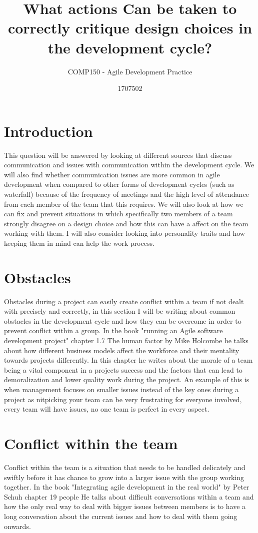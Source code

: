 \documentclass{scrartcl}
\title{What actions Can be taken to correctly critique design choices in the development cycle?}
\subtitle{COMP150 - Agile Development Practice}
\author{1707502}
\begin{document}
\maketitle

\abstract{}

\section{Introduction}

This question will be answered by looking at different sources that discuss communication and issues with communication within the development cycle. We will also find whether communication issues are more common in agile development when compared to other forms of development cycles (such as waterfall) because of the frequency of meetings and the high level of attendance from each member of the team that this requires. We will also look at how we can fix and prevent situations in which specifically two members of a team strongly disagree on a design choice and how this can have a affect on the team working with them. I will also consider looking into personality traits and how keeping them in mind can help the work process.

\section{Obstacles}

Obstacles during a project can easily create conflict within a team if not dealt with precisely and correctly, in this section I will be writing about common obstacles in the development cycle and how they can be overcome in order to prevent conflict within a group. In the book "running an Agile software development project" chapter 1.7 The human factor by Mike Holcombe \cite{holcombe2008running} he talks about how different business models affect the workforce and their mentality towards projects differently. In this chapter he writes about the morale of a team being a vital component in a projects success and the factors that can lead to demoralization and lower quality work during the project. An example of this is when management focuses on smaller issues instead of the key ones during a project as nitpicking your team can be very frustrating for everyone involved, every team will have issues, no one team is perfect in every aspect.   

\section{Conflict within the team}

Conflict within the team is a situation that needs to be handled delicately and swiftly before it has chance to grow into a larger issue with the group working together. In the book "Integrating agile development in the real world" by Peter Schuh chapter 19 people \cite{schuh2004integrating} He talks about difficult conversations within a team and how the only real way to deal with bigger issues between members is to have a long conversation about the current issues and how to deal with them going onwards.  




\end{document}
